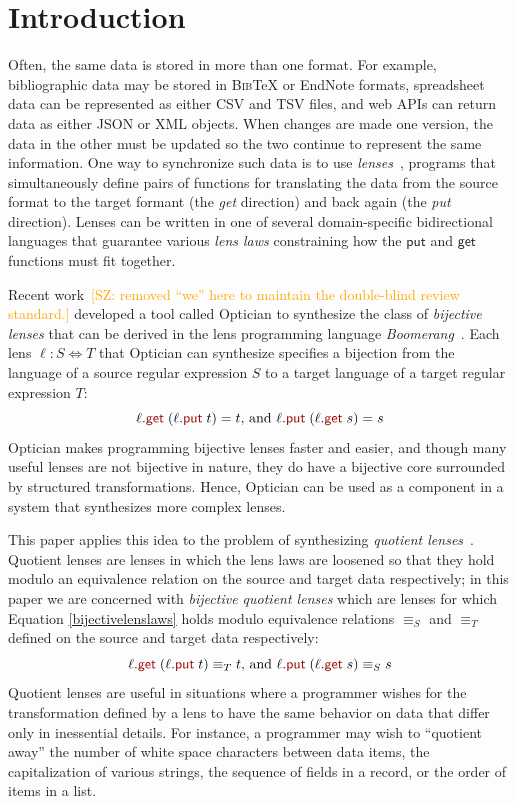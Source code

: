 \documentclass[acmsmall,review,anonymous]{acmart}
\newcommand{\FINISH}[3]{\ifdraft\textcolor{#1}{[#2: #3]}\fi}
\newcommand{\saz}[1]{\FINISH{orange}{SZ}{#1}}
\newcommand{\kw}[1]{\textcolor{dkred}{\ensuremath{\mathsf{#1}}}}
\newcommand{\bibtex}{\textsc{Bib}\TeX{}}
\newcommand{\get}{\ensuremath{\kw{get}}}
\newcommand{\lput}{\ensuremath{\kw{put}}}
\begin{document}
\section{Introduction}
Often, the same data is stored in more than one format. For example,
bibliographic data may be stored in \bibtex{} or EndNote formats,
spreadsheet data can be represented as either CSV and TSV files, and web
APIs can return data as either JSON or XML objects.  When changes are
made one version, the data in the other must be updated so the
two continue to represent the same information.
One way to synchronize such data is to use \emph{lenses}~\cite{Lenses}, 
programs that simultaneously define pairs of functions for translating
the data from the source format to the target formant (the \emph{get}
direction) and back again (the \emph{put} direction). Lenses can be
written in one of several domain-specific bidirectional languages that 
guarantee various \emph{lens laws} constraining how the \kw{put} and
\kw{get} functions must fit together. 

Recent work~\cite{optician}\saz{removed ``we'' here to maintain the double-blind
  review standard.} developed a tool called Optician to synthesize the
class of {\em bijective lenses} that can be derived in the lens programming
language {\em Boomerang}~\cite{boomerang}. Each lens $\ell : S \Leftrightarrow T$
that Optician can synthesize specifies a bijection from the language of a
source regular expression $S$ to a target language of a target regular
expression $T$: \begin{equation}\label{bijectivelenslaws} \ell.\get \;
(\ell.\lput \; t) = t \text{, and } \ell.\lput \; (\ell.\get \; s) = s
\end{equation}
Optician makes programming bijective lenses faster and easier, and though
many useful lenses are not bijective in nature, they do have a bijective core
surrounded by structured transformations. Hence, Optician can be used as a
component in a system that synthesizes more complex lenses.

This paper applies this idea to the problem of
synthesizing {\em quotient lenses}~\cite{quotientlenses}.
Quotient lenses are lenses in which the lens laws are
loosened so that they hold modulo an equivalence relation on the source and
target data respectively; in this paper we are concerned with {\em bijective
quotient lenses} which are lenses for which Equation \ref{bijectivelenslaws}
holds modulo equivalence relations $\equiv_S$ and $\equiv_T$ defined on the source
and target data respectively:
\begin{equation}\label{quotientlenslaws}
\ell.\get \; (\ell.\lput \; t) \equiv_T t \text{, and } \ell.\lput \; (\ell.\get
\; s) \equiv_S s
\end{equation}
Quotient lenses are useful in situations where a programmer wishes for the
transformation defined by a lens to have the same behavior on data that differ
only in inessential details. For instance, a programmer may wish to ``quotient
away'' the number of white space characters between data items, the
capitalization of various strings, the sequence of fields in a record, or the
order of items in a list.
\end{document}
